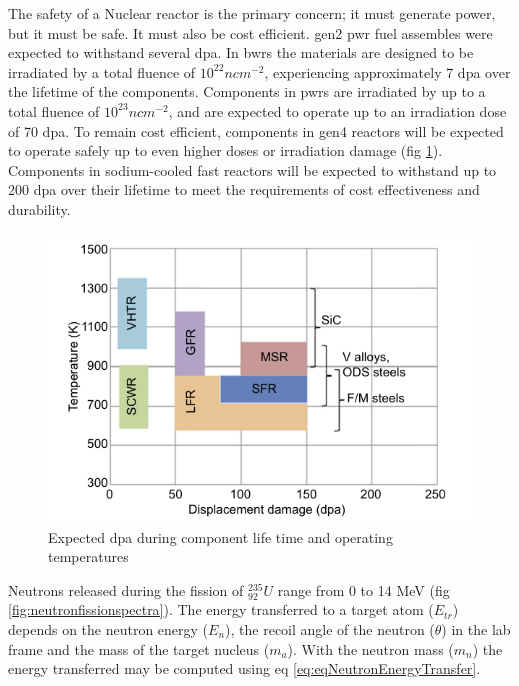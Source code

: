 The safety of a Nuclear reactor is the primary concern; it must generate power, but it must be safe.  It must also be cost efficient.  \acrshort{gen2} \acrshort{pwr} fuel assembles were expected to withstand several \acrshort{dpa}\cite{genIVstrucmat}.  In \acrshort{bwr}s the materials are designed to be irradiated by a total fluence of $10^{22} n cm^{-2}$, experiencing approximately 7 \acrshort{dpa} over the lifetime of the components\cite{lightwaterallenbusby}.  Components in \acrshort{pwr}s are irradiated by up to a total fluence of $10^{23} n cm^{-2}$, and are expected to operate up to an irradiation dose of 70 \acrshort{dpa}\cite{lightwaterallenbusby}.  To remain cost efficient, components in \acrshort{gen4} reactors will be expected to operate safely up to even higher doses or irradiation damage (fig \ref{fig:genIVdpa}).  Components in sodium-cooled fast reactors will be expected to withstand up to 200 \acrshort{dpa} over their lifetime to meet the requirements of cost effectiveness and durability\cite{genIVstrucmat}.


\begin{figure}[h]
  \begin{center}
    \includegraphics[scale=0.60]{chapters/austenitic_steels_in_nuclear/images/dpagenIV.png}
    \caption{Expected \acrshort{dpa} during component life time and operating temperatures\cite{genIVstrucmat}}
    \label{fig:genIVdpa}
  \end{center}
\end{figure}
\FloatBarrier

Neutrons released during the fission of ${}^{235}_{92}U$ range from 0 to 14 MeV (fig \ref{fig:neutronfissionspectra}).  The energy transferred to a target atom ($E_{tr}$) depends on the neutron energy ($E_n$), the recoil angle of the neutron ($\theta$) in the lab frame and the mass of the target nucleus ($m_a$).  With the neutron mass ($m_n$) the energy transferred may be computed using eq \ref{eq:eqNeutronEnergyTransfer}\cite{dosimetrygreening}.  

